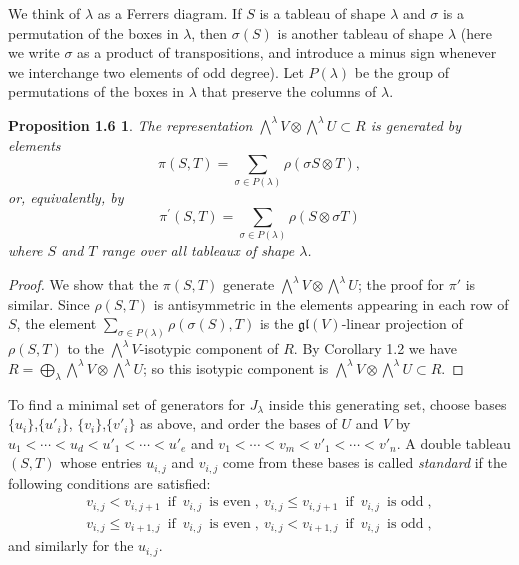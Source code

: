 \documentclass{tran-l}
\theoremstyle{plain}
\newtheorem*{theorem8}{Proposition 1.6}
\theoremstyle{remark}
\theoremstyle{definition}
\newcommand{\gl}{{\mathfrak {gl}}}
\begin{document}
We think of $\lambda $ as a Ferrers diagram. If $S$ is a tableau of
shape $\lambda $ and $\sigma $ is a permutation of the boxes in $\lambda $,
then $\sigma (S)$ is another tableau of shape $\lambda $ (here we write
$\sigma $ as a product of transpositions, and introduce a minus sign
whenever we interchange two elements of odd degree).
Let $P(\lambda )$ be the group of permutations of the boxes in 
$\lambda $ that preserve the columns of $\lambda $.

\begin{theorem8}
The representation
$\bigwedge ^{\lambda }V\otimes \bigwedge ^{\lambda }U\subset R$
is generated by elements 
\begin{equation*}\pi (S, T)=\sum _{\sigma \in P(\lambda )} \rho (\sigma S\otimes T ),
\end{equation*} 
or,
equivalently, by 
\begin{equation*}\pi ^{\prime }(S, T)=\sum _{\sigma \in P(\lambda )} \rho (S\otimes \sigma T)
\end{equation*}
where $S$ and $T$ range over all tableaux of shape $\lambda $.
\end{theorem8}
\begin{proof} We show that the $\pi (S,T)$ generate $\bigwedge ^{\lambda
}V\otimes \bigwedge ^{\lambda }U$; the proof for $\pi '$ is
similar. 
Since $\rho (S,T)$ is antisymmetric in the elements appearing
in each row of $S$, the element 
$\sum _{\sigma \in P(\lambda )}\rho (\sigma (S), T)$ is 
the $\gl (V)$-linear projection of $\rho (S,T)$ to the 
$\bigwedge ^{\lambda }V$-isotypic component of $R$.
By Corollary 1.2 we have 
$R=\bigoplus _{\lambda }\bigwedge ^{\lambda }V\otimes \bigwedge ^{\lambda }U$;
so this isotypic component is 
$\bigwedge ^{\lambda }V\otimes \bigwedge ^{\lambda }U\subset R$.
\end{proof}


To find a minimal set of generators for
 $J_{\lambda }$ inside this generating set, choose bases 
$\{u_{i}\}$,$\{u'_{i}\}$, $\{v_{i}\}$,$\{v'_{i}\}$ as above, and 
order the bases of $U$ and $V$ by
$u_{1}<\cdots <u_{d}<u'_{1}<\cdots <u'_{e}$ and
$v_{1}<\cdots <v_{m}<v'_{1}<\cdots <v'_{n}$.
A double tableau $(S,T)$ whose entries $u_{i,j}$ and $v_{i,j}$
come from these bases is called {\em standard\/} if the
following conditions are satisfied:
 \begin{gather*}
v_{i,j}<v_{i,j+1}\ 
\operatorname{if}\ v_{i,j}\ \operatorname{is\ even},\ 
v_{i,j}\le v_{i,j+1}\ \operatorname{if}\ v_{i,j}\ \operatorname{is\ odd},\\
v_{i,j}\le v_{i+1,j}\ \operatorname{if}\ v_{i,j}\ \operatorname{is\ even},\ 
v_{i,j}< v_{i+1,j}\ \operatorname{if}\ v_{i,j}\ \operatorname{is\ odd},
\end{gather*}
and similarly for the $u_{i,j}$.
\end{document}
